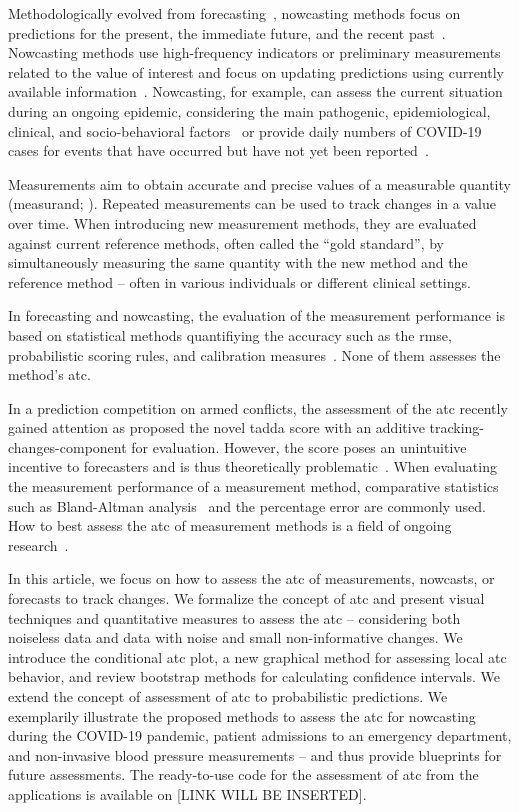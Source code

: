 \documentclass[pdflatex]{sn-jnl}
\theoremstyle{plain}%
\theoremstyle{definition}
\begin{document}
Methodologically evolved from forecasting~\citep{Browning1989}, nowcasting methods focus on predictions for the present, the immediate future, and the recent past~\citep{Banbura2013, WorldMeteorologicalOrganizationWMO2017}.
Nowcasting methods use high-frequency indicators or preliminary measurements related to the value of interest and focus on updating predictions using currently available information~\citep{Castle2017}.
Nowcasting, for example, can assess the current situation during an ongoing epidemic, considering the main pathogenic, epidemiological, clinical, and socio-behavioral factors~\citep{Wu2021} or provide daily numbers of COVID-19 cases for events that have occurred but have not yet been reported~\citep{Gunther2021, Wolffram2023}.

Measurements aim to obtain accurate and precise values of a measurable quantity (measurand; \citealp{Squara2021,Squara2021a}).
Repeated measurements can be used to track changes in a value over time.
When introducing new measurement methods, they are evaluated against current reference methods, often called the \enquote{gold standard}, by simultaneously measuring the same quantity with the new method and the reference method – often in various individuals or different clinical settings.

In forecasting and nowcasting, the evaluation of the measurement performance is based on statistical methods quantifiying the accuracy such as the \ac{rmse}, probabilistic scoring rules, and calibration measures~\citep{Gneiting2007, Gunther2021, Wolffram2023}.
None of them assesses the method's \ac{atc}.

In a prediction competition on armed conflicts, the assessment of the \ac{atc} recently gained attention as \citet{Vesco2022} proposed the novel \ac{tadda} score with an additive tracking-changes-component for evaluation.
However, the score poses an unintuitive incentive to forecasters and is thus theoretically problematic~\parencite{Bracher2023}.
When evaluating the measurement performance of a measurement method, comparative statistics such as Bland-Altman analysis~\citep{Bland1986} and the percentage error \parencite{Critchley1999} are commonly used.
How to best assess the \ac{atc} of measurement methods is a field of ongoing research~\citep{Saugel2015, Saugel2018, Hiraishi2021}.

In this article, we focus on how to assess the \ac{atc} of measurements, nowcasts, or forecasts to track changes. We formalize the concept of \ac{atc} and present visual techniques and quantitative measures to assess the \ac{atc} – considering both noiseless data and data with noise and small non-informative changes.
We introduce the conditional \ac{atc} plot, a new graphical method for assessing local \ac{atc} behavior, and review bootstrap methods for calculating confidence intervals.
We extend the concept of assessment of \ac{atc} to probabilistic predictions.
We exemplarily illustrate the proposed methods to assess the \ac{atc} for nowcasting during the COVID-19 pandemic, patient admissions to an emergency department, and non-invasive blood pressure measurements – and thus provide blueprints for future assessments.
The ready-to-use code for the assessment of \ac{atc} from the applications is available on [LINK WILL BE INSERTED].
\end{document}
